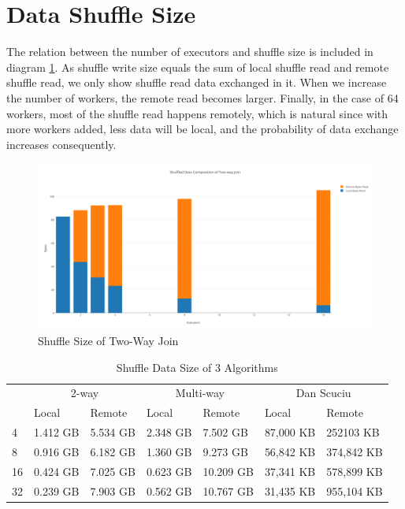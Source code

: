 \section{Data Shuffle Size}
The relation between the number of executors and shuffle size is included in diagram \ref{fig:two-way-join-shuffle}. As shuffle write size equals the sum of local shuffle read and remote shuffle read, we only show shuffle read data exchanged in it.  When we increase the number of workers, the remote read becomes larger. Finally, in the case of 64 workers, most of the shuffle read happens remotely, which is natural since with more workers added, less data will be local, and the probability of data exchange increases consequently.
\begin{figure}[h!]
  \caption{Shuffle Size of Two-Way Join}
  \label{fig:two-way-join-shuffle}
  \centering
    \includegraphics[width=1.0\textwidth]{img/Two-Way-Join-Shuffle-Data}
\end{figure}
\begin{table}[]
\centering
\caption{Shuffle Data Size of 3 Algorithms}
\label{Alibaba-Shuffle-Size}
\begin{tabular}{l|ll|ll|ll|}
   & \multicolumn{2}{c|}{2-way} & \multicolumn{2}{c|}{Multi-way} & \multicolumn{2}{c|}{Dan Scuciu} \\ \cline{2-7} 
   & Local         & Remote        & Local      & Remote      & Local          & Remote         \\ \hline
4  & 1.412 GB        & 5.534 GB        & 2.348 GB      & 7.502 GB        & 87,000 KB               & 252103 KB               \\
8  & 0.916 GB          & 6.182 GB         & 1.360 GB     & 9.273 GB        & 56,842 KB              & 374,842 KB              \\
16 & 0.424 GB          & 7.025 GB         & 0.623 GB       & 10.209 GB       & 37,341 KB              & 578,899 KB              \\
32 & 0.239 GB          & 7.903 GB         & 0.562 GB       & 10.767 GB       & 31,435 KB              & 955,104 KB             
\end{tabular}
\end{table}
